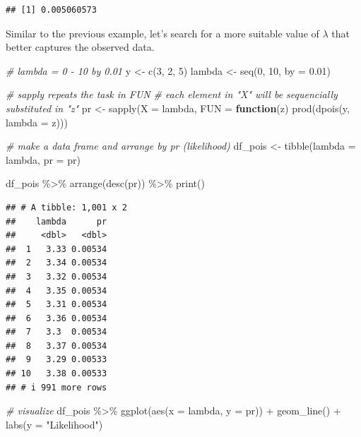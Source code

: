 \documentclass[
]{article}
\newenvironment{Shaded}{\begin{snugshade}}{\end{snugshade}}
\newcommand{\AttributeTok}[1]{\textcolor[rgb]{0.77,0.63,0.00}{#1}}
\newcommand{\CommentTok}[1]{\textcolor[rgb]{0.56,0.35,0.01}{\textit{#1}}}
\newcommand{\ControlFlowTok}[1]{\textcolor[rgb]{0.13,0.29,0.53}{\textbf{#1}}}
\newcommand{\DecValTok}[1]{\textcolor[rgb]{0.00,0.00,0.81}{#1}}
\newcommand{\FloatTok}[1]{\textcolor[rgb]{0.00,0.00,0.81}{#1}}
\newcommand{\FunctionTok}[1]{\textcolor[rgb]{0.00,0.00,0.00}{#1}}
\newcommand{\NormalTok}[1]{#1}
\newcommand{\OtherTok}[1]{\textcolor[rgb]{0.56,0.35,0.01}{#1}}
\newcommand{\SpecialCharTok}[1]{\textcolor[rgb]{0.00,0.00,0.00}{#1}}
\newcommand{\StringTok}[1]{\textcolor[rgb]{0.31,0.60,0.02}{#1}}
\begin{document}
\begin{verbatim}
## [1] 0.005060573
\end{verbatim}

Similar to the previous example, let's search for a more suitable value of \(\lambda\) that better captures the observed data.

\begin{Shaded}
\begin{Highlighting}[]
\CommentTok{\# lambda = 0 {-} 10 by 0.01}
\NormalTok{y }\OtherTok{\textless{}{-}} \FunctionTok{c}\NormalTok{(}\DecValTok{3}\NormalTok{, }\DecValTok{2}\NormalTok{, }\DecValTok{5}\NormalTok{)}
\NormalTok{lambda }\OtherTok{\textless{}{-}} \FunctionTok{seq}\NormalTok{(}\DecValTok{0}\NormalTok{, }\DecValTok{10}\NormalTok{, }\AttributeTok{by =} \FloatTok{0.01}\NormalTok{)}

\CommentTok{\# sapply repeats the task in FUN}
\CommentTok{\# each element in "X" will be sequencially substituted in "z"}
\NormalTok{pr }\OtherTok{\textless{}{-}} \FunctionTok{sapply}\NormalTok{(}\AttributeTok{X =}\NormalTok{ lambda,}
             \AttributeTok{FUN =} \ControlFlowTok{function}\NormalTok{(z) }\FunctionTok{prod}\NormalTok{(}\FunctionTok{dpois}\NormalTok{(y, }\AttributeTok{lambda =}\NormalTok{ z)))}

\CommentTok{\# make a data frame and arrange by pr (likelihood)}
\NormalTok{df\_pois }\OtherTok{\textless{}{-}} \FunctionTok{tibble}\NormalTok{(}\AttributeTok{lambda =}\NormalTok{ lambda,}
                  \AttributeTok{pr =}\NormalTok{ pr)}

\NormalTok{df\_pois }\SpecialCharTok{\%\textgreater{}\%} 
  \FunctionTok{arrange}\NormalTok{(}\FunctionTok{desc}\NormalTok{(pr)) }\SpecialCharTok{\%\textgreater{}\%} 
  \FunctionTok{print}\NormalTok{()}
\end{Highlighting}
\end{Shaded}

\begin{verbatim}
## # A tibble: 1,001 x 2
##    lambda      pr
##     <dbl>   <dbl>
##  1   3.33 0.00534
##  2   3.34 0.00534
##  3   3.32 0.00534
##  4   3.35 0.00534
##  5   3.31 0.00534
##  6   3.36 0.00534
##  7   3.3  0.00534
##  8   3.37 0.00534
##  9   3.29 0.00533
## 10   3.38 0.00533
## # i 991 more rows
\end{verbatim}

\begin{Shaded}
\begin{Highlighting}[]
\CommentTok{\# visualize}
\NormalTok{df\_pois }\SpecialCharTok{\%\textgreater{}\%} 
  \FunctionTok{ggplot}\NormalTok{(}\FunctionTok{aes}\NormalTok{(}\AttributeTok{x =}\NormalTok{ lambda,}
             \AttributeTok{y =}\NormalTok{ pr)) }\SpecialCharTok{+}
  \FunctionTok{geom\_line}\NormalTok{() }\SpecialCharTok{+}
  \FunctionTok{labs}\NormalTok{(}\AttributeTok{y =} \StringTok{"Likelihood"}\NormalTok{)}
\end{Highlighting}
\end{Shaded}
\end{document}
